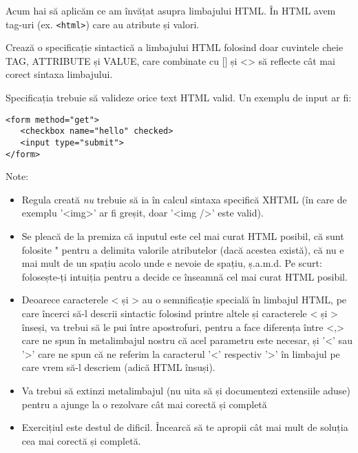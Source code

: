 \begin{Exercise}[title={Sintaxa HTML},label={ex:sintaxa_html},difficulty=3]
Acum hai să aplicăm ce am învățat asupra limbajului HTML. În HTML avem
tag-uri (ex. \texttt{<html>}) care au atribute și valori.

\Question Crează o specificație sintactică a limbajului HTML folosind
doar cuvintele cheie TAG, ATTRIBUTE și VALUE, care combinate
cu [] și <> să reflecte cât mai corect sintaxa limbajului.

Specificația trebuie să valideze orice text HTML valid.
Un exemplu de input ar fi:
\begin{verbatim}
<form method="get">
   <checkbox name="hello" checked>
   <input type="submit">
</form>
\end{verbatim}
\ExeText
Note:
\begin{itemize}
\item Regula creată \textit{nu} trebuie să ia în calcul sintaxa
specifică XHTML (în care de exemplu '<img>' ar fi greșit, doar '<img />' este valid).
\item Se pleacă de la premiza că inputul este cel mai curat HTML posibil, că
sunt folosite " pentru a delimita valorile atributelor (dacă acestea există), că
nu e mai mult de un spațiu acolo unde e nevoie de spațiu, ș.a.m.d. Pe scurt:
folosește-ți intuiția pentru a decide ce înseamnă {\glqq}cel mai curat HTML posibil{\grqq}.
\item Deoarece caracterele < și > au o semnificație specială în limbajul HTML, pe
care încerci să-l descrii sintactic folosind printre altele
și caracterele < și > înseși, va trebui să le pui între apostrofuri, pentru a face
diferența între <,> care ne spun în metalimbajul nostru
că acel parametru este necesar, și '<' sau '>' care
ne spun că ne referim la caracterul '<' respectiv '>' în limbajul pe care
vrem să-l descriem (adică HTML însuși).
\item Va trebui să extinzi metalimbajul (nu uita să și documentezi extensiile aduse)
pentru a ajunge la o rezolvare cât mai corectă și completă
\item Exercițiul este destul de dificil. Încearcă să te apropii cât mai mult de soluția
cea mai corectă și completă.
\end{itemize}
\end{Exercise}
